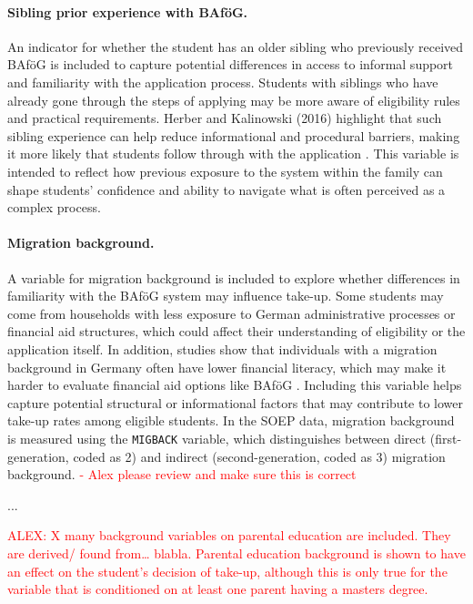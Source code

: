 \paragraph{Sibling prior experience with BAföG.} An indicator for whether the student has an older sibling who previously received BAföG is included to capture potential differences in access to informal support and familiarity with the application process. Students with siblings who have already gone through the steps of applying may be more aware of eligibility rules and practical requirements. Herber and Kalinowski (2016) highlight that such sibling experience can help reduce informational and procedural barriers, making it more likely that students follow through with the application \citep{herber_non-take-up_2019}. This variable is intended to reflect how previous exposure to the system within the family can shape students’ confidence and ability to navigate what is often perceived as a complex process.

\paragraph{Migration background.} A variable for migration background is included to explore whether differences in familiarity with the BAföG system may influence take-up. Some students may come from households with less exposure to German administrative processes or financial aid structures, which could affect their understanding of eligibility or the application itself. In addition, studies show that individuals with a migration background in Germany often have lower financial literacy, which may make it harder to evaluate financial aid options like BAföG \citep{Tsegay_2024}. Including this variable helps capture potential structural or informational factors that may contribute to lower take-up rates among eligible students. In the SOEP data, migration background is measured using the \texttt{MIGBACK} variable, which distinguishes between direct (first-generation, coded as 2) and indirect (second-generation, coded as 3) migration background. \textcolor{red}{- Alex please review and make sure this is correct}

...

\textcolor{red}{ALEX: X many background variables on parental education are included. They are derived/ found from… blabla.
Parental education background is shown to have an effect on the student’s decision of take-up, although this is only true for the variable that is conditioned on at least one parent having a masters degree.}

